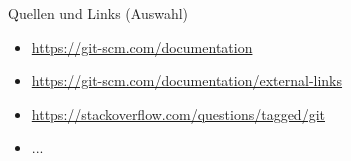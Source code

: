 \documentclass{beamer}
\begin{document}

\begin{frame}[label=link10]{Quellen und Links (Auswahl)}
\tiny
\begin{itemize}
 \item \url{https://git-scm.com/documentation}
 \item \url{https://git-scm.com/documentation/external-links}
 \item \url{https://stackoverflow.com/questions/tagged/git}
\item ...
\end{itemize}
\end{frame}



%
\end{document}
